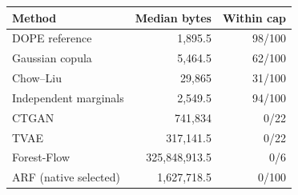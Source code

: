 \begin{tabular}{@{}lrr@{}}
\toprule
Method & Median bytes & Within cap \\
\midrule
DOPE reference & 1{,}895.5 & 98/100 \\
Gaussian copula & 5{,}464.5 & 62/100 \\
Chow--Liu & 29{,}865 & 31/100 \\
Independent marginals & 2{,}549.5 & 94/100 \\
CTGAN & 741{,}834 & 0/22 \\
TVAE & 317{,}141.5 & 0/22 \\
Forest-Flow & 325{,}848{,}913.5 & 0/6 \\
ARF (native selected) & 1{,}627{,}718.5 & 0/100 \\
\bottomrule
\end{tabular}
